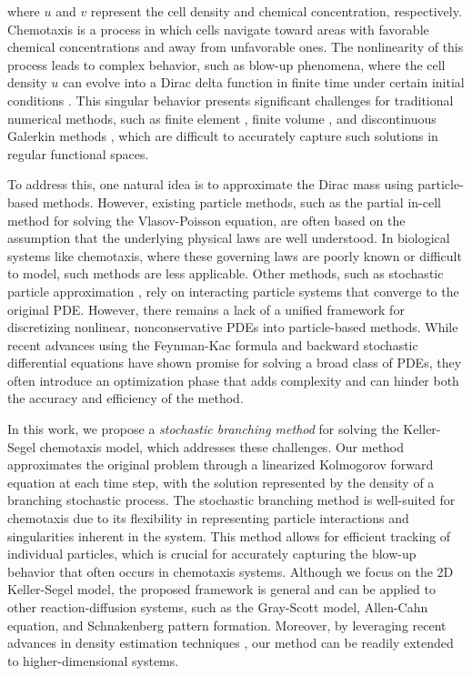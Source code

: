 \documentclass[12pt]{article}
\begin{document}
where $u$ and $v$ represent the cell density and chemical concentration, respectively. Chemotaxis is a process in which cells navigate toward areas with favorable chemical concentrations and away from unfavorable ones. The nonlinearity of this process leads to complex behavior, such as blow-up phenomena, where the cell density $u$ can evolve into a Dirac delta function in finite time under certain initial conditions \cite{filbet2006finite, gajewski1998global, herrero1997finite, nagai1995blow}. This singular behavior presents significant challenges for traditional numerical methods, such as finite element \cite{nakaguchi2002fully, saito2011error, strehl2013positivity}, finite volume \cite{filbet2006finite}, and discontinuous Galerkin methods \cite{epshteyn2009new}, which are difficult to accurately capture such solutions in regular functional spaces.



To address this, one natural idea is to approximate the Dirac mass using particle-based methods. However, existing particle methods, such as the partial in-cell method \cite{birdsall2018plasma, hockney2021computer} for solving the Vlasov-Poisson equation, are often based on the assumption that the underlying physical laws are well understood. In biological systems like chemotaxis, where these governing laws are poorly known or difficult to model, such methods are less applicable. Other methods, such as stochastic particle approximation \cite{havskovec2009stochastic, wang2025novel}, rely on interacting particle systems that converge to the original PDE. However, there remains a lack of a unified framework for discretizing nonlinear, nonconservative PDEs into particle-based methods.
While recent advances using the Feynman-Kac formula \cite{han2024deep, hutzenthaler2021speed, nguwi2024deep} and backward stochastic differential equations \cite{han2017deep, han2018solving, hure2020deep} have shown promise for solving a broad class of PDEs, they often introduce an optimization phase that adds complexity and can hinder both the accuracy and efficiency of the method.

In this work, we propose a \textit{stochastic branching method} for solving the Keller-Segel chemotaxis model, which addresses these challenges. Our method approximates the original problem through a linearized Kolmogorov forward equation at each time step, with the solution represented by the density of a branching stochastic process. The stochastic branching method is well-suited for chemotaxis due to its flexibility in representing particle interactions and singularities inherent in the system. This method allows for efficient tracking of individual particles, which is crucial for accurately capturing the blow-up behavior that often occurs in chemotaxis systems.
Although we focus on the 2D Keller-Segel model, the proposed framework is general and can be applied to other reaction-diffusion systems, such as the Gray-Scott model, Allen-Cahn equation, and Schnakenberg pattern formation. Moreover, by leveraging recent advances in density estimation techniques \cite{novikov2021tensor, tang2025wavelet, sheng2025approximation, tang2024solving}, our method can be readily extended to higher-dimensional systems.
\end{document}

